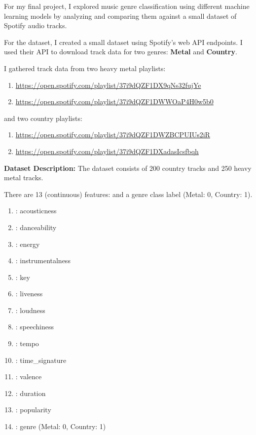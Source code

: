 \documentclass[../../project.tex]{subfiles}
\begin{document}
    For my final project, I explored music genre classification using different machine
    learning models by analyzing and comparing them against a small dataset of Spotify
    audio tracks.

    For the dataset, I created a small dataset using Spotify's web API endpoints.
    I used their API to download track data for two genres: \textbf{Metal} and
    \textbf{Country}.

    I gathered track data from two heavy metal playlists:
    \begin{enumerate}
        \item \url{https://open.spotify.com/playlist/37i9dQZF1DX9qNs32fujYe}
        \item \url{https://open.spotify.com/playlist/37i9dQZF1DWWOaP4H0w5b0}
    \end{enumerate}

    and two country playlists:
    \begin{enumerate}
        \item \url{https://open.spotify.com/playlist/37i9dQZF1DWZBCPUIUs2iR}
        \item \url{https://open.spotify.com/playlist/37i9dQZF1DXadasIcsfbqh}
    \end{enumerate}

    \textbf{Dataset Description: } The dataset consists of 200 country tracks and 250
    heavy metal tracks.

    There are 13 (continuous) features:  and a genre class label
     (Metal: 0, Country: 1).

    \begin{enumerate}
        \item {}: acousticness
        \item {}: danceability
        \item {}: energy
        \item {}: instrumentalness
        \item {}: key
        \item {}: liveness
        \item {}: loudness
        \item {}: speechiness
        \item {}: tempo
        \item {}: time\_signature
        \item {}: valence
        \item {}: duration
        \item {}: popularity
        \item {}: genre (Metal: 0, Country: 1)
    \end{enumerate}

    \newpage
\end{document}
